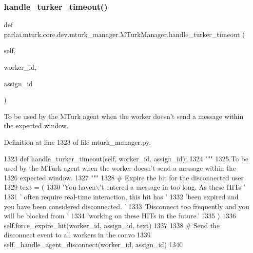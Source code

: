 \subsubsection{\texorpdfstring{handle\+\_\+turker\+\_\+timeout()}{handle\_turker\_timeout()}}
{\footnotesize\ttfamily def parlai.\+mturk.\+core.\+dev.\+mturk\+\_\+manager.\+M\+Turk\+Manager.\+handle\+\_\+turker\+\_\+timeout (\begin{DoxyParamCaption}\item[{}]{self,  }\item[{}]{worker\+\_\+id,  }\item[{}]{assign\+\_\+id }\end{DoxyParamCaption})}

\begin{DoxyVerb}To be used by the MTurk agent when the worker doesn't send a message within the
expected window.
\end{DoxyVerb}
 

Definition at line 1323 of file mturk\+\_\+manager.\+py.


\begin{DoxyCode}
1323     \textcolor{keyword}{def }handle\_turker\_timeout(self, worker\_id, assign\_id):
1324         \textcolor{stringliteral}{"""}
1325 \textcolor{stringliteral}{        To be used by the MTurk agent when the worker doesn't send a message within the}
1326 \textcolor{stringliteral}{        expected window.}
1327 \textcolor{stringliteral}{        """}
1328         \textcolor{comment}{# Expire the hit for the disconnected user}
1329         text = (
1330             \textcolor{stringliteral}{'You haven\(\backslash\)'t entered a message in too long. As these HITs '}
1331             \textcolor{stringliteral}{' often require real-time interaction, this hit has '}
1332             \textcolor{stringliteral}{'been expired and you have been considered disconnected. '}
1333             \textcolor{stringliteral}{'Disconnect too frequently and you will be blocked from '}
1334             \textcolor{stringliteral}{'working on these HITs in the future.'}
1335         )
1336         self.force\_expire\_hit(worker\_id, assign\_id, text)
1337 
1338         \textcolor{comment}{# Send the disconnect event to all workers in the convo}
1339         self.\_handle\_agent\_disconnect(worker\_id, assign\_id)
1340 
\end{DoxyCode}
\mbox{\label{classparlai_1_1mturk_1_1core_1_1dev_1_1mturk__manager_1_1MTurkManager_af9050e4f1d79eec81797bc8a7b088835}} 
